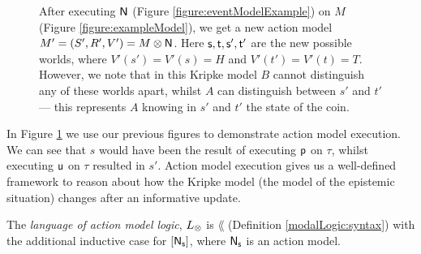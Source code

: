 \begin{figure}
\centering
{}
\caption[Kripke model after action model execution]{After executing $\mathrm{\mathsf{N}}$ (Figure \ref{figure:eventModelExample}) on $M$ (Figure
\ref{figure:exampleModel}), we get a new action model $M' = (S',R',V') = M \otimes \mathrm{\mathsf{N}}$.
Here $\mathrm{\mathsf{s}},\mathrm{\mathsf{t}},\mathrm{\mathsf{s}}',\mathrm{\mathsf{t}}'$ are the new possible worlds, where $V'(s') = V'(s) = H$ and $V'(t') =
V'(t) = T$.
However, we note that in this Kripke model $B$ cannot distinguish any of these worlds apart, whilst
$A$ can distinguish between $s'$ and $t'$ --- this represents $A$ knowing in $s'$ and $t'$ the state
of the coin.}
\label{figure:eventModelPostExecution}
\end{figure}

In Figure \ref{figure:eventModelPostExecution} we use our previous figures to
demonstrate action model execution.
We can see that $s$ would have been the result of executing $\mathrm{\mathsf{p}}$ on $\tau$, whilst executing
$\mathrm{\mathsf{u}}$ on $\tau$ resulted in $s'$.
Action model execution gives us a well-defined framework to reason about how the Kripke model
(the model of the epistemic situation) changes after an informative update.

\begin{defn} \label{actModelLogic:syntax}
	The {\em language of action model logic}, $L_{\otimes}$ is $\lang$ (Definition
	\ref{modalLogic:syntax}) with the additional inductive case for $[{\mathrm{\mathsf{N}}_\mathrm{\mathsf{s}}}]$, where
	$\mathrm{\mathsf{N}}_\mathrm{\mathsf{s}}$ is an action model.
\end{defn}

